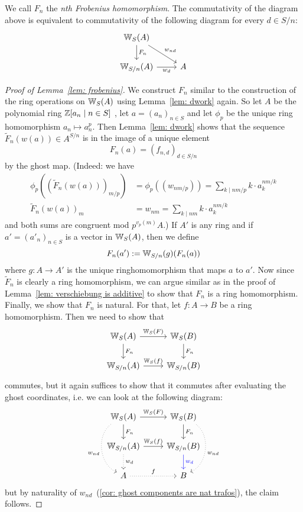     We call $F_n$ the \textit{nth Frobenius homomorphism}.
    The commutativity of the diagram above is equivalent to
    commutativity of the following diagram for every $d \in S/n$:
    \[
        \begin{tikzcd}
            \W_S(A) \arrow[d,"F_n"] \arrow[dr,"w_{nd}"] \\
            \W_{S/n}(A) \arrow[r,"w_d"'] 
            & A
        \end{tikzcd}
    \]

\begin{proof}[Proof of Lemma~\ref*{lem: frobenius}]
    We construct $F_n$ similar to the construction of the ring operations on $\mathbb{W}_S(A)$ 
    using Lemma~\ref{lem: dwork} again. So let $A$ be the polynomial ring $\mathbb{Z}[a_n\mid n \in S]$
    , let $a = (a_n)_{n \in S}$ and let $\phi_p$ be the unique ring homomorphism
    $a_n \mapsto a_n^p$. Then Lemma~\ref{lem: dwork} shows that the sequence
    $\widetilde{F}_n(w(a)) \in A^{S/n}$ is in the image of a unique element
    \[
      F_n(a)  =(f_{n,d})_{d \in S/n}
    \]
    by the ghost map. (Indeed: we have 
    \begin{align*}
        \phi_{p}((\widetilde{F}_n(w(a)))_{m/p}) &= \phi_{p}((w_{nm/p})) 
        = \sum_{k \mid nm/p} k \cdot a_k^{nm/k} \\
        \widetilde{F}_n(w(a))_m
        &= w_{nm}
        = \sum_{k \mid nm} k \cdot a_k^{nm/k}
    \end{align*}
    and both sums are congruent mod $p^{v_p(m)}A$.)
    If $A'$ is any ring and if $a' = (a'_n)_{n \in S}$ is a vector in $\mathbb{W}_S(A)$,
    then we define
    \[
      F_n(a') := \mathbb{W}_{S/n}(g)(F_n(a))  
    \]
    where $g \colon A \to A'$ is the unique ringhomomorphism that maps $a$ to $a'$.
    Now since $\widetilde{F}_n$ is clearly a ring homomorphism,
    we can argue similar as in the proof of Lemma~\ref{lem: verschiebung is additive}
    to show that $F_n$ is a ring homomorphism. Finally, we show that $F_n$ is natural.
    For that, let $f \colon A \to B$ be a ring homomorphism. Then we need to show that
    \[
        \begin{tikzcd}
            \W_S(A) \arrow[r,"\W_S(F)"] \arrow[d,"F_n"] 
              & \W_S(B) \arrow[d,"F_n"] \\
            \W_{S/n}(A) \arrow[r,"\W_S(f)"]
              & \W_{S/n}(B)
        \end{tikzcd}
    \]
    commutes, but it again suffices to show 
    that it commutes after
    evaluating the ghost coordinates, i.e. we can look at the following diagram:
    \[
        \begin{tikzcd}
            \W_S(A) \arrow[r,"\W_S(F)"] \arrow[d,"F_n"] \ar[dd,"w_{nd}"',dotted,bend right = 60]
              & \W_S(B) \arrow[d,"F_n"] \ar[dd,"w_{nd}",dotted,bend left = 60]\\
            \W_{S/n}(A) \arrow[r,"\W_S(f)"] \ar[d,"w_d",dotted]
              & \W_{S/n}(B) \ar[d,"w_d",blue] \\
              A \ar[r,"f",dotted] 
              & B
        \end{tikzcd}  
    \]
    but by naturality of $w_{nd}$~(\ref{cor: ghost components are nat trafos}), the claim follows.
\end{proof}
